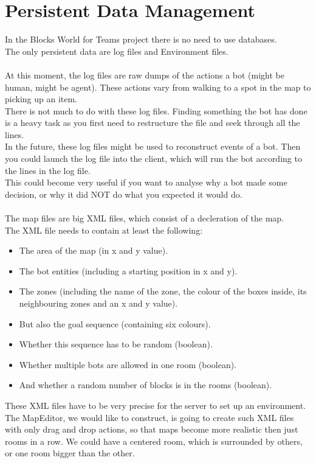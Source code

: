 \section{Persistent Data Management}
  In the Blocks World for Teams project there is no need to use databases. \\
  The only persistent data are log files and Environment files.\\ \\
  At this moment, the log files are raw dumps of the actions a bot (might be human, might be agent).
  These actions vary from walking to a spot in the map to picking up an item. \\
  There is not much to do with these log files. Finding something the bot has done is a heavy task as you first need to
  restructure the file and seek through all the lines. \\
  In the future, these log files might be used to reconstruct events of a bot.
  Then you could launch the log file into the client, which will run the bot according to the lines in the log file. \\
  This could become very useful if you want to analyse why a bot made some decision,
  or why it did NOT do what you expected it would do. \\ \\
  The map files are big XML files, which consist of a decleration of the map. \\
  The XML file needs to contain at least the following: \\
  \begin{itemize}
  \item The area of the map (in x and y value).
  \item The bot entities (including a starting position in x and y).
  \item The zones (including the name of the zone, the colour of the boxes inside, its neighbouring zones
    and an x and y value).
  \item But also the goal sequence (containing six colours).
  \item Whether this sequence has to be random (boolean).
  \item Whether multiple bots are allowed in one room (boolean).
  \item And whether a random number of blocks is in the rooms (boolean).
  \end{itemize}
  
  These XML files have to be very precise for the server to set up an environment. The MapEditor, we would like to construct,
  is going to create such XML files with only drag and drop actions, so that maps become more realistic
  then just rooms in a row. We could have a centered room, which is surrounded by others, or one room bigger than the other.
